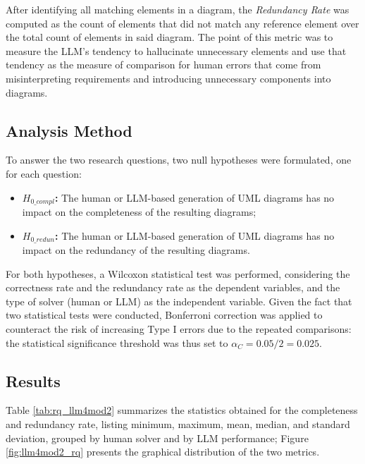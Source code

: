 After identifying all matching elements in a diagram, the \textit{Redundancy Rate} was computed as the count of elements that did not match any reference element over the total count of elements in said diagram. The point of this metric was to measure the LLM's tendency to hallucinate unnecessary elements and use that tendency as the measure of comparison for human errors that come from misinterpreting requirements and introducing unnecessary components into diagrams.

\subsection{Analysis Method}

To answer the two research questions, two null hypotheses were formulated, one for each question:

\begin{itemize}
    \item \textbf{${H_{0\_{compl}}}$:} The human or LLM-based generation of UML diagrams has no impact on the completeness of the resulting diagrams;
    \item \textbf{${H_{0\_{redun}}}$:} The human or LLM-based generation of UML diagrams has no impact on the redundancy of the resulting diagrams.
\end{itemize}

For both hypotheses, a Wilcoxon statistical test was performed, considering the correctness rate and the redundancy rate as the dependent variables, and the type of solver (human or LLM) as the independent variable. Given the fact that two statistical tests were conducted, Bonferroni correction was applied to counteract the risk of increasing Type I errors due to the repeated comparisons: the statistical significance threshold was thus set to $\alpha_C = 0.05 / 2 =  0.025$.


\subsection{Results}

Table \ref{tab:rq_llm4mod2} summarizes the statistics obtained for the completeness and redundancy rate, listing minimum, maximum, mean, median, and standard deviation, grouped by human solver and by LLM performance; Figure \ref{fig:llm4mod2_rq} presents the graphical distribution of the two metrics.

